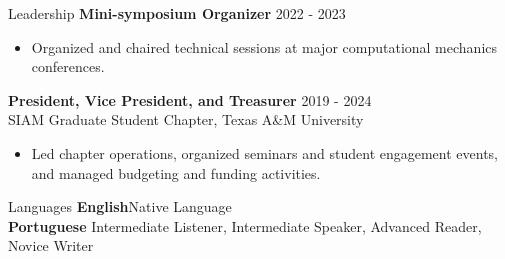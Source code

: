 \documentclass{resume} %
\begin{document}
\begin{rSection}{Leadership}
\textbf{Mini-symposium Organizer} \hfill 2022 - 2023
\begin{itemize}
   \item Organized and chaired technical sessions at major computational mechanics conferences.
\end{itemize}
\vspace{0.75em}
\textbf{President, Vice President, and Treasurer} \hfill 2019 - 2024 \\
SIAM Graduate Student Chapter, Texas A\&M University
\begin{itemize}
   \item Led chapter operations, organized seminars and student engagement events, and managed budgeting and funding activities.
\end{itemize}
\end{rSection}

\begin{rSection}{Languages}
\textbf{English}\hfill Native Language \\
\textbf{Portuguese} \hfill Intermediate Listener, Intermediate Speaker, Advanced Reader, Novice Writer
\end{rSection}
\end{document}
